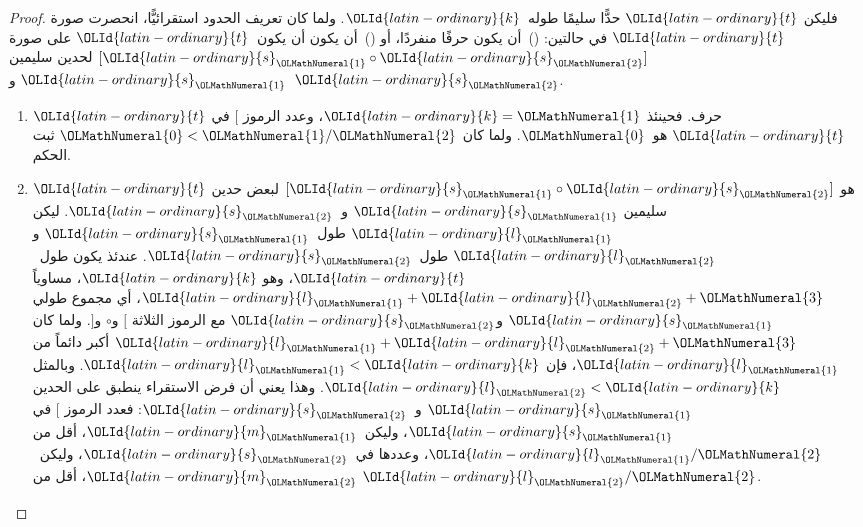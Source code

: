 \documentclass[../../../include/open-logic-section]{subfiles}
\begin{document}
\begin{proof}
فليكن $\OLId{latin-ordinary}{t}$ حدًّا سليمًا طوله~$\OLId{latin-ordinary}{k}$. ولما كان تعريف الحدود استقرائيًّا،
انحصرت صورة $\OLId{latin-ordinary}{t}$ في حالتين: ()~أن يكون حرفًا منفردًا، أو ()~أن يكون
  أن يكون~$\OLId{latin-ordinary}{t}$ على صورة $[\OLId{latin-ordinary}{s}_\OLMathNumeral{1} \circ \OLId{latin-ordinary}{s}_\OLMathNumeral{2}]$ لحدين سليمين $\OLId{latin-ordinary}{s}_\OLMathNumeral{1}$ و~$\OLId{latin-ordinary}{s}_\OLMathNumeral{2}$.
\begin{enumerate}
\item $\OLId{latin-ordinary}{t}$ حرف. فحينئذ $\OLId{latin-ordinary}{k} = \OLMathNumeral{1}$، وعدد الرموز $[$ في $\OLId{latin-ordinary}{t}$ هو~$\OLMathNumeral{0}$.
ولما كان $\OLMathNumeral{0} < \OLMathNumeral{1}/\OLMathNumeral{2}$ ثبت الحكم.
\item $\OLId{latin-ordinary}{t}$ هو $[\OLId{latin-ordinary}{s}_\OLMathNumeral{1} \circ \OLId{latin-ordinary}{s}_\OLMathNumeral{2}]$ لبعض حدين سليمين $\OLId{latin-ordinary}{s}_\OLMathNumeral{1}$ و~$\OLId{latin-ordinary}{s}_\OLMathNumeral{2}$.
  ليكن $\OLId{latin-ordinary}{l}_\OLMathNumeral{1}$ طول~$\OLId{latin-ordinary}{s}_\OLMathNumeral{1}$ و$\OLId{latin-ordinary}{l}_\OLMathNumeral{2}$ طول~$\OLId{latin-ordinary}{s}_\OLMathNumeral{2}$. عندئذ يكون طول~$\OLId{latin-ordinary}{t}$، وهو
  $\OLId{latin-ordinary}{k}$، مساوياً $\OLId{latin-ordinary}{l}_\OLMathNumeral{1}+\OLId{latin-ordinary}{l}_\OLMathNumeral{2}+\OLMathNumeral{3}$، أي مجموع طولي $\OLId{latin-ordinary}{s}_\OLMathNumeral{1}$ و$\OLId{latin-ordinary}{s}_\OLMathNumeral{2}$ مع الرموز
  الثلاثة $[$ و$\circ$ و$]$. ولما كان $\OLId{latin-ordinary}{l}_\OLMathNumeral{1}+\OLId{latin-ordinary}{l}_\OLMathNumeral{2}+\OLMathNumeral{3}$ أكبر دائماً من
  $\OLId{latin-ordinary}{l}_\OLMathNumeral{1}$، فإن $\OLId{latin-ordinary}{l}_\OLMathNumeral{1} < \OLId{latin-ordinary}{k}$. وبالمثل $\OLId{latin-ordinary}{l}_\OLMathNumeral{2} < \OLId{latin-ordinary}{k}$. وهذا يعني أن فرض
  الاستقراء ينطبق على الحدين $\OLId{latin-ordinary}{s}_\OLMathNumeral{1}$ و~$\OLId{latin-ordinary}{s}_\OLMathNumeral{2}$: فعدد الرموز $[$ في
  $\OLId{latin-ordinary}{s}_\OLMathNumeral{1}$، وليكن~$\OLId{latin-ordinary}{m}_\OLMathNumeral{1}$، أقل من $\OLId{latin-ordinary}{l}_\OLMathNumeral{1}/\OLMathNumeral{2}$، وعددها في~$\OLId{latin-ordinary}{s}_\OLMathNumeral{2}$، وليكن~$\OLId{latin-ordinary}{m}_\OLMathNumeral{2}$،
  أقل من $\OLId{latin-ordinary}{l}_\OLMathNumeral{2}/\OLMathNumeral{2}$.


\end{enumerate}
\end{proof}
\end{document}
